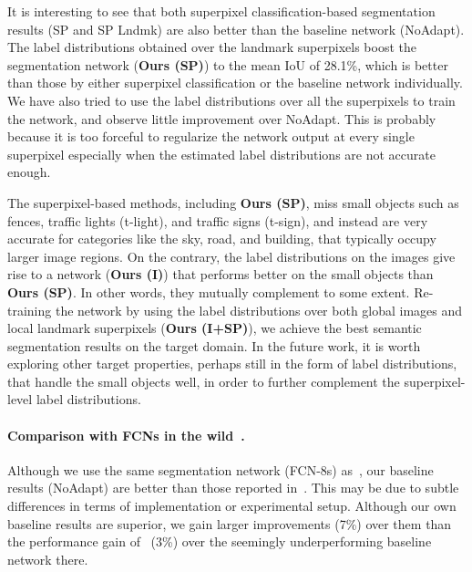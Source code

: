 It is interesting to see that both superpixel classification-based segmentation results (SP and SP Lndmk) are also better than the baseline network (NoAdapt). The label distributions obtained over the landmark superpixels boost the segmentation network (\textbf{Ours (SP)}) to the mean IoU of 28.1\%, which is better than those by either superpixel classification or the baseline network individually. We have also tried to use the label distributions over all the superpixels to train the network, and observe little improvement over NoAdapt. This is probably because it is too forceful to regularize the network output at every single superpixel especially when the estimated label distributions are not accurate enough. 


The superpixel-based methods, including \textbf{Ours (SP)}, miss small objects such as fences, traffic lights (t-light), and traffic signs (t-sign), and instead are very accurate for categories like the sky, road, and building, that typically occupy larger image regions. On the contrary, the label distributions on the images give rise to a network (\textbf{Ours (I)}) that performs better on the small objects than \textbf{Ours (SP)}. In other words, they mutually complement to some extent. Re-training the network by using the label distributions over both global images and local landmark superpixels (\textbf{Ours (I+SP)}), we achieve the best semantic segmentation results on the target domain. In the future work, it is worth exploring other target properties, perhaps still in the form of label distributions, that handle the small objects well, in order to further complement the superpixel-level label distributions.
\vspace{-15pt}

\paragraph{Comparison with FCNs in the wild~\cite{hoffman_fcns_2016}.} 
Although we use the same segmentation network (FCN-8s) as~\cite{hoffman_fcns_2016},  our baseline results (NoAdapt) are better than those reported in~\cite{hoffman_fcns_2016}. This may be due to subtle differences in terms of implementation or experimental setup. Although our own baseline results are superior,  we gain larger improvements (7\%) over them than the performance gain of~\cite{hoffman_fcns_2016} (3\%) over the seemingly underperforming baseline network there. 
\vspace{-10pt}


